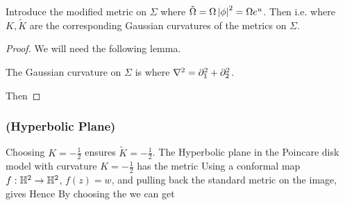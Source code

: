 \documentclass{article}
\begin{document}
\begin{prop}
Introduce the modified metric on $\Sigma$
where $\tilde{\Omega} = \Omega \left\lvert \phi \right\rvert^2 = \Omega e^u$. Then 
i.e. 
where $K,\tilde{K}$ are the corresponding Gaussian curvatures of the metrics on $\Sigma$. 
\end{prop}
\begin{proof}
We will need the following lemma.
\begin{lemma}
The Gaussian curvature on $\Sigma$ is 
where $\nabla^2 = \partial_1^2 + \partial_2^2$. 
\end{lemma}
Then 
\end{proof}

\subsubsection{ (Hyperbolic Plane)}
Choosing $K = -\frac{1}{2}$ ensures $\tilde{K}=-\frac{1}{2}$. The Hyperbolic plane in the Poincare disk model with curvature $K = -\frac{1}{2}$ has the metric 
Using a conformal map $f : \mathbb{H}^2 \to \mathbb{H}^2$, $f(z) = w$, and pulling back the standard metric on the image, gives 
Hence 
By choosing the we can get 
\end{document}
